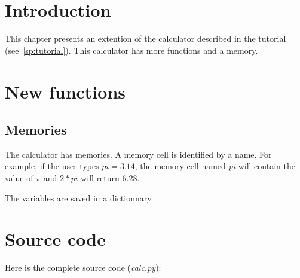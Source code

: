 \section{Introduction}

This chapter presents an extention of the calculator described in the tutorial (see~\ref{sp:tutorial}).
This calculator has more functions and a memory.

\section{New functions}

\subsection{Memories}

The calculator has memories.
A memory cell is identified by a name.
For example, if the user types \emph{$pi = 3.14$}, the memory cell named \emph{pi} will contain the value of \emph{$\pi$} and \emph{$2*pi$} will return \emph{$6.28$}.

The variables are saved in a dictionnary.

\section{Source code}

Here is the complete source code (\emph{calc.py}):


